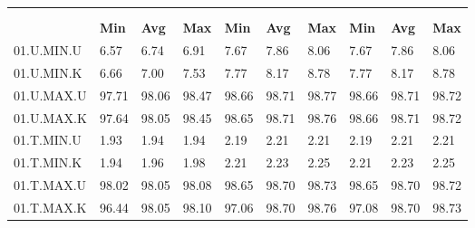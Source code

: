 \begin{tabular}{|>{\raggedright}p{}|>{\raggedright}p{}|>{\raggedright}p{}|>{\raggedright}p{}|>{\raggedright}p{}|>{\raggedright}p{}|>{\raggedright}p{}|>{\raggedright}p{}|>{\raggedright}p{}|>{\raggedright}p{}|}
\hline 
\multirow{3}{0.12\columnwidth}{\textbf{\footnotesize{}Bezeichnung}} & \multicolumn{9}{l|}{\textbf{\footnotesize{}TX-Bitrate {[}MBit/s{]}}}\tabularnewline
\cline{2-10} 
& \multicolumn{3}{l|}{\textbf{\footnotesize{}prp1}} & \multicolumn{3}{l|}{\textbf{\footnotesize{}eth0}} & \multicolumn{3}{l|}{\textbf{\footnotesize{}eth1}}\tabularnewline
\cline{2-10} 
& \textbf{\footnotesize{}Min} & \textbf{\footnotesize{}Avg} & \textbf{\footnotesize{}Max} & \textbf{\footnotesize{}Min} & \textbf{\footnotesize{}Avg} & \textbf{\footnotesize{}Max} & \textbf{\footnotesize{}Min} & \textbf{\footnotesize{}Avg} & \textbf{\footnotesize{}Max}\tabularnewline
\hline 
\hline 
{\footnotesize{}01.U.MIN.U} & {\footnotesize{}6.57} & {\footnotesize{}6.74} & {\footnotesize{}6.91} & {\footnotesize{}7.67} & {\footnotesize{}7.86} & {\footnotesize{}8.06} & {\footnotesize{}7.67} & {\footnotesize{}7.86} & {\footnotesize{}8.06}\tabularnewline
\hline 
\hline 
{\footnotesize{}01.U.MIN.K} & {\footnotesize{}6.66} & {\footnotesize{}7.00} & {\footnotesize{}7.53} & {\footnotesize{}7.77} & {\footnotesize{}8.17} & {\footnotesize{}8.78} & {\footnotesize{}7.77} & {\footnotesize{}8.17} & {\footnotesize{}8.78}\tabularnewline
\hline 
\hline 
{\footnotesize{}01.U.MAX.U} & {\footnotesize{}97.71} & {\footnotesize{}98.06} & {\footnotesize{}98.47} & {\footnotesize{}98.66} & {\footnotesize{}98.71} & {\footnotesize{}98.77} & {\footnotesize{}98.66} & {\footnotesize{}98.71} & {\footnotesize{}98.72}\tabularnewline
\hline 
\hline 
{\footnotesize{}01.U.MAX.K} & {\footnotesize{}97.64} & {\footnotesize{}98.05} & {\footnotesize{}98.45} & {\footnotesize{}98.65} & {\footnotesize{}98.71} & {\footnotesize{}98.76} & {\footnotesize{}98.66} & {\footnotesize{}98.71} & {\footnotesize{}98.72}\tabularnewline
\hline 
\hline 
{\footnotesize{}01.T.MIN.U} & {\footnotesize{}1.93} & {\footnotesize{}1.94} & {\footnotesize{}1.94} & {\footnotesize{}2.19} & {\footnotesize{}2.21} & {\footnotesize{}2.21} & {\footnotesize{}2.19} & {\footnotesize{}2.21} & {\footnotesize{}2.21}\tabularnewline
\hline 
\hline 
{\footnotesize{}01.T.MIN.K} & {\footnotesize{}1.94} & {\footnotesize{}1.96} & {\footnotesize{}1.98} & {\footnotesize{}2.21} & {\footnotesize{}2.23} & {\footnotesize{}2.25} & {\footnotesize{}2.21} & {\footnotesize{}2.23} & {\footnotesize{}2.25}\tabularnewline
\hline 
\hline 
{\footnotesize{}01.T.MAX.U} & {\footnotesize{}98.02} & {\footnotesize{}98.05} & {\footnotesize{}98.08} & {\footnotesize{}98.65} & {\footnotesize{}98.70} & {\footnotesize{}98.73} & {\footnotesize{}98.65} & {\footnotesize{}98.70} & {\footnotesize{}98.72}\tabularnewline
\hline 
\hline 
{\footnotesize{}01.T.MAX.K} & {\footnotesize{}96.44} & {\footnotesize{}98.05} & {\footnotesize{}98.10} & {\footnotesize{}97.06} & {\footnotesize{}98.70} & {\footnotesize{}98.76} & {\footnotesize{}97.08} & {\footnotesize{}98.70} & {\footnotesize{}98.73}\tabularnewline
\hline 
\end{tabular}
\par
